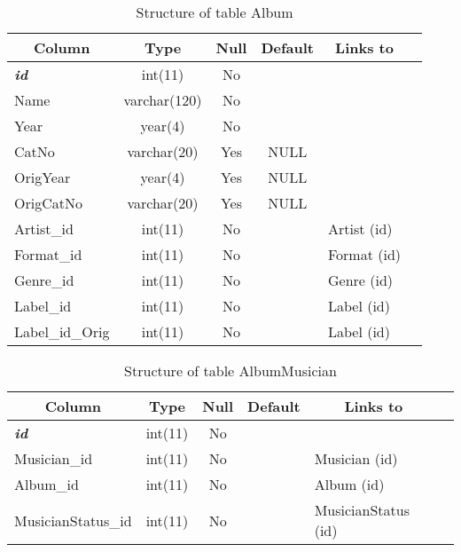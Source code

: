 \chapter*{}
{}

%
%
 \begin{longtable}{|l|c|c|c|l|l|} 
 \caption{Structure of table Album} \label{tab:Album-structure} \\
 \hline \multicolumn{1}{|c|}{\textbf{Column}} & \multicolumn{1}{|c|}{\textbf{Type}} & \multicolumn{1}{|c|}{\textbf{Null}} & \multicolumn{1}{|c|}{\textbf{Default}} & \multicolumn{1}{|c|}{\textbf{Links to}} \\ \hline \hline
\textbf{\textit{id}} & int(11) & No &  &  \\ \hline 
Name & varchar(120) & No &  &  \\ \hline 
Year & year(4) & No &  &  \\ \hline 
CatNo & varchar(20) & Yes & NULL &  \\ \hline 
OrigYear & year(4) & Yes & NULL &  \\ \hline 
OrigCatNo & varchar(20) & Yes & NULL &  \\ \hline 
Artist\_id & int(11) & No &  & Artist (id) \\ \hline 
Format\_id & int(11) & No &  & Format (id) \\ \hline 
Genre\_id & int(11) & No &  & Genre (id) \\ \hline 
Label\_id & int(11) & No &  & Label (id) \\ \hline 
Label\_id\_Orig & int(11) & No &  & Label (id) \\ \hline 
 \end{longtable}

%
%
 \begin{longtable}{|l|c|c|c|l|l|} 
 \caption{Structure of table AlbumMusician} \label{tab:AlbumMusician-structure} \\
 \hline \multicolumn{1}{|c|}{\textbf{Column}} & \multicolumn{1}{|c|}{\textbf{Type}} & \multicolumn{1}{|c|}{\textbf{Null}} & \multicolumn{1}{|c|}{\textbf{Default}} & \multicolumn{1}{|c|}{\textbf{Links to}} \\ \hline \hline
\textbf{\textit{id}} & int(11) & No &  &  \\ \hline 
Musician\_id & int(11) & No &  & Musician (id) \\ \hline 
Album\_id & int(11) & No &  & Album (id) \\ \hline 
MusicianStatus\_id & int(11) & No &  & MusicianStatus (id) \\ \hline 
 \end{longtable}

